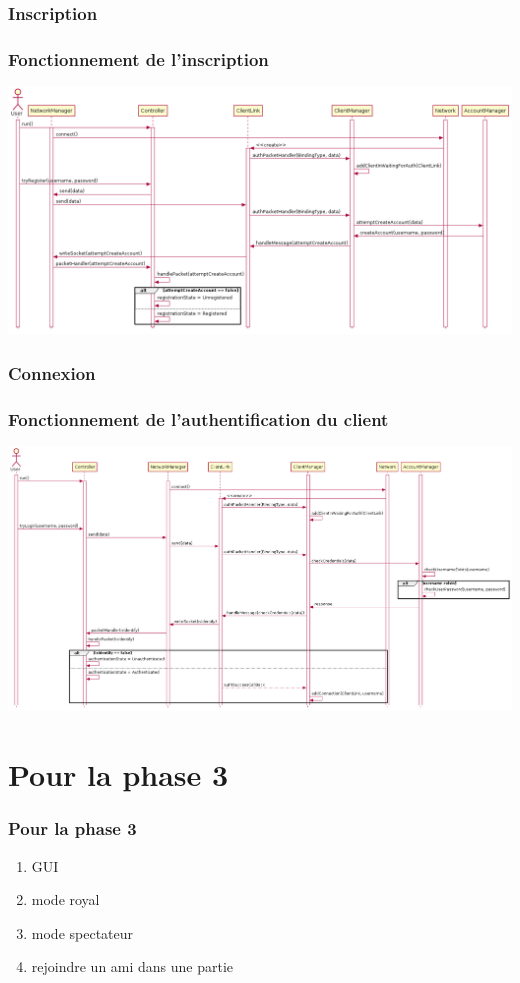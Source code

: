 \documentclass{beamer}
\begin{document}
\subsubsection{Inscription}
\begin{frame}
\frametitle{Fonctionnement de l'inscription}

\includegraphics[width=1\textwidth]{../../res/uml/sequence/InscriptionSequence.png}
\end{frame}

\subsubsection{Connexion}
\begin{frame}
\frametitle{Fonctionnement de l'authentification du client}

\includegraphics[width=1\textwidth]{../../res/uml/sequence/ConnexionSequence.png}
\end{frame}

\section{Pour la phase 3}
\begin{frame}
\frametitle{Pour la phase 3}

\begin{enumerate}
	\item GUI
	\item mode royal 
	\item mode spectateur
	\item rejoindre un ami dans une partie
\end{enumerate}
\end{frame}
\end{document}
